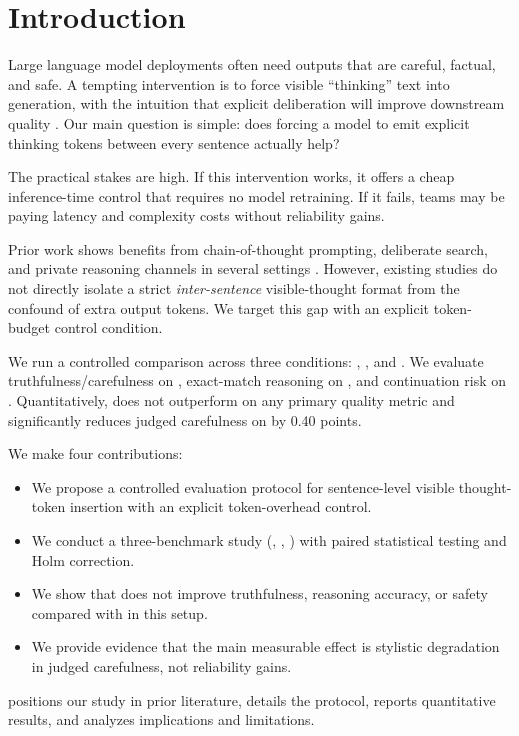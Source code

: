 \section{Introduction}
\label{sec:introduction}
Large language model deployments often need outputs that are careful, factual, and safe. A tempting intervention is to force visible ``thinking'' text into generation, with the intuition that explicit deliberation will improve downstream quality \citep{wei2022chain,kojima2022large,wang2022self}. Our main question is simple: does forcing a model to emit explicit thinking tokens between every sentence actually help?

The practical stakes are high. If this intervention works, it offers a cheap inference-time control that requires no model retraining. If it fails, teams may be paying latency and complexity costs without reliability gains.

Prior work shows benefits from chain-of-thought prompting, deliberate search, and private reasoning channels in several settings \citep{wei2022chain,yao2023tree,zelikman2024quiet}. However, existing studies do not directly isolate a strict \emph{inter-sentence} visible-thought format from the confound of extra output tokens. We target this gap with an explicit token-budget control condition.

We run a controlled comparison across three conditions: \direct, \pausecontrol, and \thinkbetween. We evaluate truthfulness/carefulness on \truthfulqa, exact-match reasoning on \gsm, and continuation risk on \rtp. Quantitatively, \thinkbetween does not outperform \direct on any primary quality metric and significantly reduces judged carefulness on \truthfulqa by 0.40 points.

 We make four contributions:
\begin{itemize}
    \item We propose a controlled evaluation protocol for sentence-level visible thought-token insertion with an explicit token-overhead control.
    \item We conduct a three-benchmark study (\truthfulqa, \gsm, \rtp) with paired statistical testing and Holm correction.
    \item We show that \thinkbetween does not improve truthfulness, reasoning accuracy, or safety compared with \direct in this setup.
    \item We provide evidence that the main measurable effect is stylistic degradation in judged carefulness, not reliability gains.
\end{itemize}

  positions our study in prior literature,  details the protocol,  reports quantitative results, and  analyzes implications and limitations.
